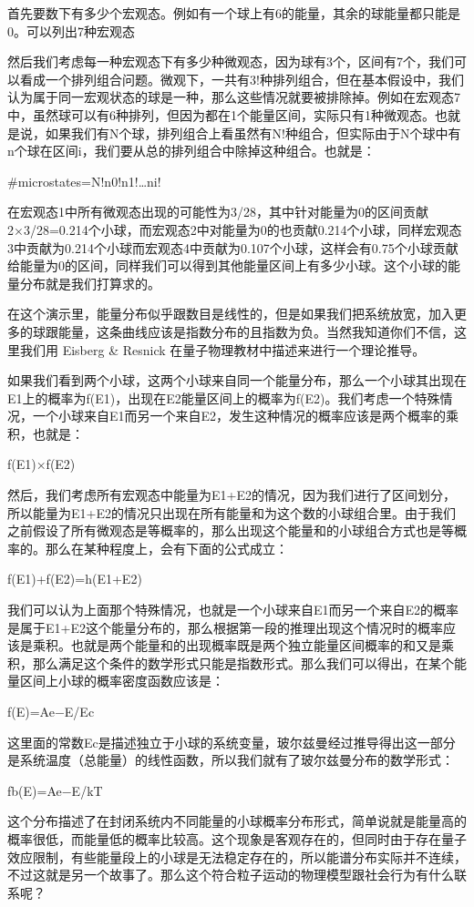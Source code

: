 \documentclass[]{book}
\begin{document}
首先要数下有多少个宏观态。例如有一个球上有6的能量，其余的球能量都只能是0。可以列出7种宏观态

然后我们考虑每一种宏观态下有多少种微观态，因为球有3个，区间有7个，我们可以看成一个排列组合问题。微观下，一共有3!种排列组合，但在基本假设中，我们认为属于同一宏观状态的球是一种，那么这些情况就要被排除掉。例如在宏观态7中，虽然球可以有6种排列，但因为都在1个能量区间，实际只有1种微观态。也就是说，如果我们有N个球，排列组合上看虽然有N!种组合，但实际由于N个球中有n个球在区间i，我们要从总的排列组合中除掉这种组合。也就是：

\#microstates=N!n0!n1!\ldots{}ni!

在宏观态1中所有微观态出现的可能性为3/28，其中针对能量为0的区间贡献2×3/28=0.214个小球，而宏观态2中对能量为0的也贡献0.214个小球，同样宏观态3中贡献为0.214个小球而宏观态4中贡献为0.107个小球，这样会有0.75个小球贡献给能量为0的区间，同样我们可以得到其他能量区间上有多少小球。这个小球的能量分布就是我们打算求的。

在这个演示里，能量分布似乎跟数目是线性的，但是如果我们把系统放宽，加入更多的球跟能量，这条曲线应该是指数分布的且指数为负。当然我知道你们不信，这里我们用 Eisberg \& Resnick 在量子物理教材中描述来进行一个理论推导。

如果我们看到两个小球，这两个小球来自同一个能量分布，那么一个小球其出现在E1上的概率为f(E1)，出现在E2能量区间上的概率为f(E2)。我们考虑一个特殊情况，一个小球来自E1而另一个来自E2，发生这种情况的概率应该是两个概率的乘积，也就是：

f(E1)×f(E2)

然后，我们考虑所有宏观态中能量为E1+E2的情况，因为我们进行了区间划分，所以能量为E1+E2的情况只出现在所有能量和为这个数的小球组合里。由于我们之前假设了所有微观态是等概率的，那么出现这个能量和的小球组合方式也是等概率的。那么在某种程度上，会有下面的公式成立：

f(E1)+f(E2)=h(E1+E2)

我们可以认为上面那个特殊情况，也就是一个小球来自E1而另一个来自E2的概率是属于E1+E2这个能量分布的，那么根据第一段的推理出现这个情况时的概率应该是乘积。也就是两个能量和的出现概率既是两个独立能量区间概率的和又是乘积，那么满足这个条件的数学形式只能是指数形式。那么我们可以得出，在某个能量区间上小球的概率密度函数应该是：

f(E)=Ae−E/Ec

这里面的常数Ec是描述独立于小球的系统变量，玻尔兹曼经过推导得出这一部分是系统温度（总能量）的线性函数，所以我们就有了玻尔兹曼分布的数学形式：

fb(E)=Ae−E/kT

这个分布描述了在封闭系统内不同能量的小球概率分布形式，简单说就是能量高的概率很低，而能量低的概率比较高。这个现象是客观存在的，但同时由于存在量子效应限制，有些能量段上的小球是无法稳定存在的，所以能谱分布实际并不连续，不过这就是另一个故事了。那么这个符合粒子运动的物理模型跟社会行为有什么联系呢？
\end{document}
